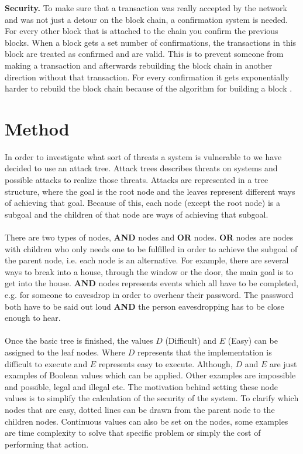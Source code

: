 \documentclass[frame, english]{idamasterthesis}
\begin{document}
\noindent
\textbf{Security.} 
To make sure that a transaction was really accepted by the network and was not just a detour on the block chain, a confirmation system is needed. For every other block that is attached to the chain you confirm the previous blocks. When a block gets a set number of confirmations, the transactions in this block are treated as confirmed and are valid. This is to prevent someone from making a transaction and afterwards rebuilding the block chain in another direction without that transaction. For every confirmation it gets exponentially harder to rebuild the block chain because of the algorithm for building a block \cite{Namecoin}.

\section{Method}
In order to investigate what sort of threats a system is vulnerable to we have decided to use an attack tree. Attack trees describes threats on systems and possible attacks to realize those threats. Attacks are represented in a tree structure, where the goal is the root node and the leaves represent different ways of achieving that goal. Because of this, each node (except the root node) is a subgoal and the children of that node are ways of achieving that subgoal. \\\\
There are two types of nodes, \textbf{AND} nodes and \textbf{OR} nodes. \textbf{OR} nodes are nodes with children who only needs one to be fulfilled in order to achieve the subgoal of the parent node, i.e. each node is an alternative. For example, there are several ways to break into a house, through the window or the door, the main goal is to get into the house. \textbf{AND} nodes represents events which all have to be completed, e.g. for someone to eavesdrop in order to overhear their password. The password both have to be said out loud \textbf{AND} the person eavesdropping has to be close enough to hear. \\\\
Once the basic tree is finished, the values $D$ (Difficult) and $E$ (Easy) can be assigned to the leaf nodes. Where $D$ represents that the implementation is difficult to execute and $E$ represents easy to execute. Although, $D$ and $E$ are just examples of Boolean values which can be applied. Other examples are impossible and possible, legal and illegal etc. The motivation behind setting these node values is to simplify the calculation of the security of the system. To clarify which nodes that are easy, dotted lines can be drawn from the parent node to the children nodes. Continuous values can also be set on the nodes, some examples are time complexity to solve that specific problem or simply the cost of performing that action. \\\\ 
\end{document}
